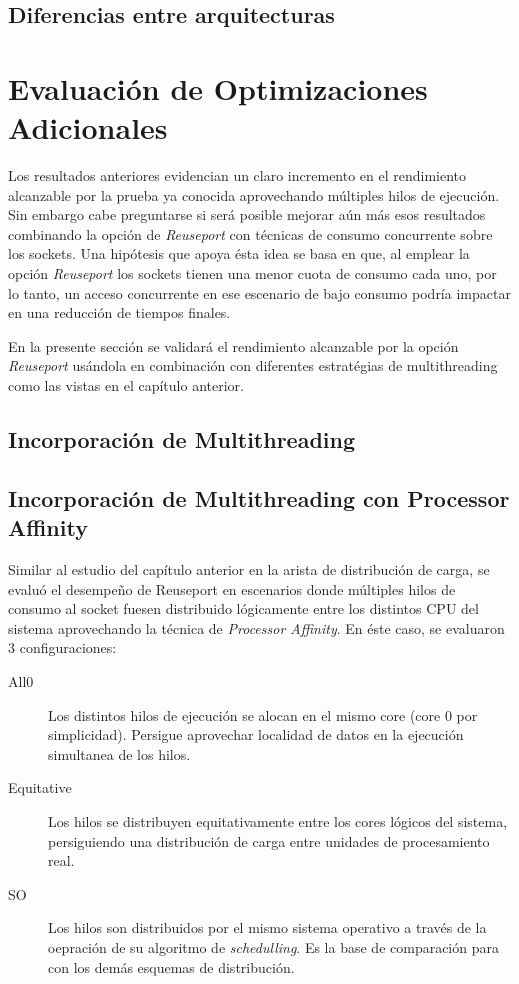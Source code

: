 \subsection{Diferencias entre arquitecturas}


\section{Evaluación de Optimizaciones Adicionales}
Los resultados anteriores evidencian un claro incremento en el rendimiento alcanzable por la prueba ya conocida aprovechando múltiples hilos de ejecución. Sin embargo cabe preguntarse si será posible mejorar aún más esos resultados combinando la opción de \emph{Reuseport} con técnicas de consumo concurrente sobre los sockets. Una hipótesis que apoya ésta idea se basa en que, al emplear la opción \emph{Reuseport} los sockets tienen una menor cuota de consumo cada uno, por lo tanto, un acceso concurrente en ese escenario de bajo consumo podría impactar en una reducción de tiempos finales.

En la presente sección se validará el rendimiento alcanzable por la opción \emph{Reuseport} usándola en combinación con diferentes estratégias de multithreading como las vistas en el capítulo anterior.

\subsection{Incorporación de Multithreading}

\subsection{Incorporación de Multithreading con Processor Affinity}
Similar al estudio del capítulo anterior en la arista de distribución de carga, se evaluó el desempeño de Reuseport en escenarios donde múltiples hilos de consumo al socket fuesen distribuido lógicamente entre los distintos CPU del sistema aprovechando la técnica de \emph{Processor Affinity}. En éste caso, se evaluaron 3 configuraciones:

\begin{description}
\item[All0] Los distintos hilos de ejecución se alocan en el mismo core (core 0 por simplicidad). Persigue aprovechar localidad de datos en la ejecución simultanea de los hilos.
\item[Equitative] Los hilos se distribuyen equitativamente entre los cores lógicos del sistema, persiguiendo una distribución de carga entre unidades de procesamiento real.
\item[SO] Los hilos son distribuidos por el mismo sistema operativo a través de la oepración de su algoritmo de \emph{schedulling}. Es la base de comparación para con los demás esquemas de distribución.
\end{description}

